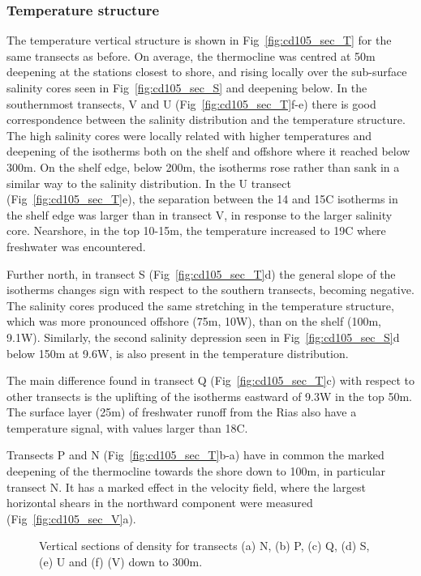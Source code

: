 \subsubsection{Temperature structure}
The temperature vertical structure is shown in
Fig~\ref{fig:cd105_sec_T} for the same transects as before. On
average, the thermocline was centred at 50m deepening at the
stations closest to shore, and rising locally over the sub-surface
salinity cores seen in Fig~\ref{fig:cd105_sec_S} and deepening
below. In the southernmost transects, V and U
(Fig~\ref{fig:cd105_sec_T}f-e) there is good correspondence
between the salinity distribution and the temperature structure.
The high salinity cores were locally related with higher
temperatures and deepening of the isotherms both on the shelf and
offshore where it reached below 300m. On the shelf edge, below
200m, the isotherms rose rather than sank in a similar way to the
salinity distribution. In the U transect
(Fig~\ref{fig:cd105_sec_T}e), the separation between the 14\deg
and 15\deg C isotherms in the shelf edge was larger than in
transect V, in response to the larger salinity core. Nearshore, in
the top 10-15m, the temperature increased to 19\deg C where
freshwater was encountered.

Further north, in transect S (Fig~\ref{fig:cd105_sec_T}d) the
general slope of the isotherms changes sign with respect to the
southern transects, becoming negative. The salinity cores produced
the same stretching in the temperature structure, which was more
pronounced offshore (75m, 10\deg W), than on the shelf (100m,
9.1\deg W). Similarly, the second salinity depression seen in
Fig~\ref{fig:cd105_sec_S}d below 150m at 9.6\deg W, is also
present in the temperature distribution.

The main difference found in transect Q
(Fig~\ref{fig:cd105_sec_T}c) with respect to other transects is
the uplifting of the isotherms eastward of 9.3\deg W in the top
50m. The surface layer (25m) of freshwater runoff from the Rias
also have a temperature signal, with values larger than 18\deg C.

Transects P and N (Fig~\ref{fig:cd105_sec_T}b-a) have in common
the marked deepening of the thermocline towards the shore down to
100m, in particular transect N. It has a marked effect in the
velocity field, where the largest horizontal shears in the
northward component were measured (Fig~\ref{fig:cd105_sec_V}a).

\begin{figure}[!th]
\centering {}%
 
 
\caption{Vertical sections of
density for transects (a) N, (b) P, (c) Q, (d) S, (e) U and (f)
(V) down to 300m.} \label{fig:cd105_sec_D}\end{figure}
